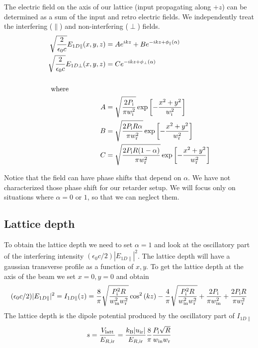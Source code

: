 The electric field on the axis of our lattice (input propagating along $+z$)
can be determined as a sum of the input and retro electric fields.  We
independently treat the interfering ($\parallel$) and non-interfering ($\perp$)
fields.  
\begin{equation}
\begin{split}
  \sqrt{\frac{2}{\epsilon_{0}c}}  
   E_{1D\parallel}(x,y,z) & = Ae^{ik z} + Be^{-ikz + \phi_{\parallel}(\alpha)} \\
  \sqrt{\frac{2}{\epsilon_{0}c}}  
  E_{1D\perp}(x,y,z) & = Ce^{-ikz + \phi_{\perp}(\alpha)} \\
   & \\ 
 \text{where}  \ \ \ \ \ \ \ \ \ \ \ \ \ \ \ \  & \\
   A & = \sqrt{ \frac{2 P_{\text{i}} }{\pi w_{\text{i}}^{2} } } 
         \exp\left[ -\frac{ x^{2} + y^{2} }{w_{\text{i}}^{2}}\right]\\ 
   B & = \sqrt{ \frac{2 P_{\text{i}}  R \alpha}{\pi w_{\text{r}}^{2} } } 
         \exp\left[ -\frac{ x^{2} + y^{2} }{w_{\text{r}}^{2}}\right]\\ 
   C & = \sqrt{ \frac{2 P_{\text{i}}  R  (1-\alpha)}{\pi w_{\text{r}}^{2} } } 
         \exp\left[ -\frac{ x^{2} + y^{2} }{w_{\text{r}}^{2}}\right]\\ 
\end{split}
\end{equation}

Notice that the field can have phase shifts that depend on $\alpha$.  We have
not characterized those phase shift for our retarder setup.  We will focus only
on situations where $\alpha=0$ or $1$,  so that we can neglect them.    


\subsection{Lattice depth}

To obtain the lattice depth we need to set $\alpha=1$ and look at the
oscillatory part of the interfering intensity
$(\epsilon_{0}c/2)|E_{1D\parallel}|^{2}$.  The lattice depth will have a
gaussian transverse profile as a function of $x,y$.  To get the lattice depth
at the axis of the beam we set $x=0,y=0$ and obtain
\begin{equation}
  (\epsilon_{0}c/2)|E_{1D\parallel}|^{2} = I_{1D\parallel}(z) =
  \frac{8}{\pi}  
   \sqrt{ \frac{  P_{\text{i}}^{2} R }{  w_{\text{in}}^{2}  w_{\text{r}}^{2}} } 
 \cos ^2\left(k z\right)
  - \frac{4}{\pi} \sqrt{ \frac{  P_{\text{i}}^{2}R }{  w_{\text{in}}^{2} w_{\text{r}}^{2} }} 
+\frac{2  P_{\text{i}} }{\pi   w_{\text{in}}^{2} }
+\frac{2  P_{\text{i}} R}{\pi   w_{\text{r}}^{2} }
\end{equation}
The lattice depth is the dipole potential produced by the oscillatory part of
$I_{1D\parallel}$
\begin{equation}
  s = 
  \frac{V_{\text{latt}}}{E_{R,\text{ir}}}  = 
  \frac{ k_{\text{B}} |u_{\text{ir}}| }{E_{R,\text{ir}}}
  \frac{8}{\pi}  
    \frac{  P_{\text{i}} \sqrt{ R } }{  w_{\text{in}}  w_{\text{r}}} 
\end{equation}

